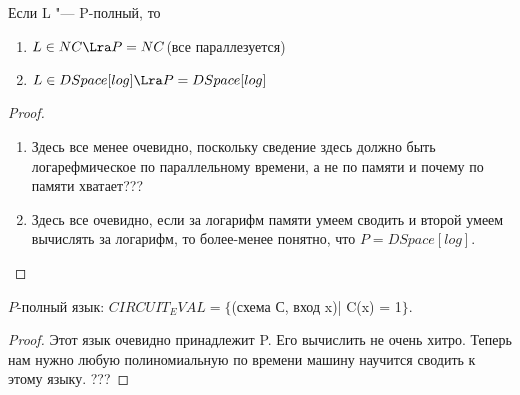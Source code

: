 \begin{theorem}
	Если L "--- P-полный, то 
	\begin{enumerate}
		\item  $L \in NC \Lra P = NC$(все параллезуется)
		\item  $L \in DSpace[log] \Lra P = DSpace[log]$
    \end{enumerate}
\end{theorem}
\begin{proof}
	\begin{enumerate}
	\item Здесь все менее очевидно, поскольку сведение здесь должно быть логарефмическое по параллельному 
	времени, а не по памяти и почему по памяти хватает???
	\item Здесь все очевидно, если за логарифм памяти умеем сводить и второй умеем вычислять за логарифм, то более-менее понятно, 
	что $P = DSpace[log]$.
\end{enumerate}
\end{proof}

\begin{theorem}
	$P$-полный язык: $CIRCUIT_EVAL = \{$(схема С, вход x)| C(x) = 1$\}$. \\
\end{theorem}
\begin{proof}
	Этот язык очевидно принадлежит P. Его вычислить не очень хитро. Теперь нам нужно любую
	полиномиальную по времени машину научится сводить к этому языку. 
	???
\end{proof}

